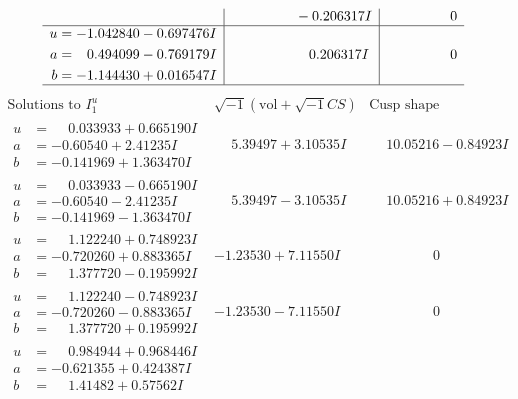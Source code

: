 \documentclass[1p]{elsarticle_modified}
\theoremstyle{definition}
\newcommand{\I}{\sqrt{-1}}
\begin{document}
$$\begin{array}{c|c|c}
 & \phantom{-0.000000 } -0.206317 I & \phantom{-0.000000 } 0 \\ \hline\begin{aligned}
u &= -1.042840 - 0.697476 I \\
a &= \phantom{-}0.494099 - 0.769179 I \\
b &= -1.144430 + 0.016547 I\end{aligned}
 & \phantom{-0.000000 -}0.206317 I & \phantom{-0.000000 } 0\\
 \hline 
 \end{array}$$\newpage$$\begin{array}{c|c|c}  
\text{Solutions to }I^u_{1}& \I (\text{vol} + \sqrt{-1}CS) & \text{Cusp shape}\\
 \hline 
\begin{aligned}
u &= \phantom{-}0.033933 + 0.665190 I \\
a &= -0.60540 + 2.41235 I \\
b &= -0.141969 + 1.363470 I\end{aligned}
 & \phantom{-}5.39497 + 3.10535 I & \phantom{-}10.05216 - 0.84923 I \\ \hline\begin{aligned}
u &= \phantom{-}0.033933 - 0.665190 I \\
a &= -0.60540 - 2.41235 I \\
b &= -0.141969 - 1.363470 I\end{aligned}
 & \phantom{-}5.39497 - 3.10535 I & \phantom{-}10.05216 + 0.84923 I \\ \hline\begin{aligned}
u &= \phantom{-}1.122240 + 0.748923 I \\
a &= -0.720260 + 0.883365 I \\
b &= \phantom{-}1.377720 - 0.195992 I\end{aligned}
 & -1.23530 + 7.11550 I & \phantom{-0.000000 } 0 \\ \hline\begin{aligned}
u &= \phantom{-}1.122240 - 0.748923 I \\
a &= -0.720260 - 0.883365 I \\
b &= \phantom{-}1.377720 + 0.195992 I\end{aligned}
 & -1.23530 - 7.11550 I & \phantom{-0.000000 } 0 \\ \hline\begin{aligned}
u &= \phantom{-}0.984944 + 0.968446 I \\
a &= -0.621355 + 0.424387 I \\
b &= \phantom{-}1.41482 + 0.57562 I\end{aligned}

\end{array}$$
\end{document}
